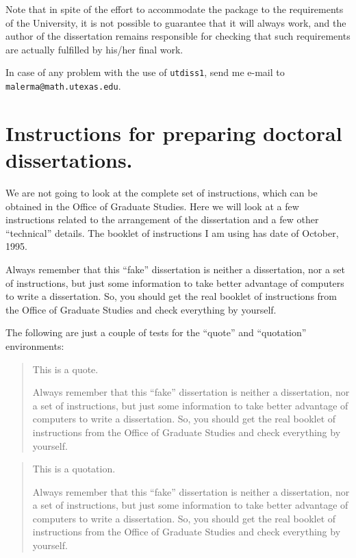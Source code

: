 \documentclass[12pt]{report} %
\theoremstyle{definition}
\theoremstyle{remark}
\begin{document}
Note that in spite of the effort to accommodate the package to 
the requirements of the University, it is not possible to 
guarantee that it will always work, and the author of the 
dissertation remains responsible for checking that such 
requirements are actually fulfilled by his/her final work.

In case of any problem with the use of \texttt{utdiss1}, 
send me e-mail to \texttt{malerma@math.utexas.edu}.



\chapter{Instructions for preparing doctoral dissertations.}
%

We are not going to look at the complete set of instructions, 
which can be obtained in the Office of Graduate Studies. 
%
Here we will look at a few instructions related to the 
arrangement of the dissertation and a few other ``technical'' 
details. The booklet of instructions I am using has date of 
October, 1995.

Always remember that this ``fake'' dissertation 
%
is neither 
a dissertation, nor a set of instructions, but just some
information to take better advantage of computers to write 
a dissertation. So, you should get the real booklet of 
instructions from the Office of Graduate Studies and check 
everything by yourself. 

The following are just a couple of tests for the ``quote''
and ``quotation'' environments:

\begin{quote}
%
This is a quote.

Always remember that this ``fake'' dissertation is neither 
a dissertation, nor a set of instructions, but just some
information to take better advantage of computers to write 
a dissertation. So, you should get the real booklet of 
instructions from the Office of Graduate Studies and check 
everything by yourself. 
\end{quote}

\begin{quotation}
%
This is a quotation.

Always remember that this ``fake'' dissertation is neither 
a dissertation, nor a set of instructions, but just some
information to take better advantage of computers to write 
a dissertation. So, you should get the real booklet of 
instructions from the Office of Graduate Studies and check 
everything by yourself. 
\end{quotation}
\end{document}
